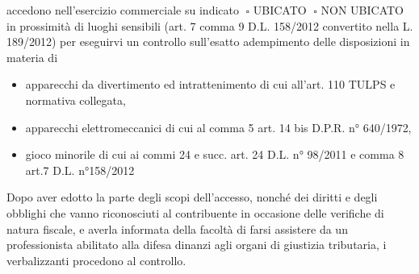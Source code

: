 \documentclass[12pt]{article}
\begin{document}
accedono nell’esercizio commerciale su indicato \begin{math} \;\square\end{math} UBICATO \begin{math}\;\square\end{math} NON UBICATO in prossimità di luoghi sensibili (art. 7 comma 9 D.L. 158/2012 convertito nella L. 189/2012)
per eseguirvi un controllo sull’esatto adempimento delle disposizioni in materia di
\begin{itemize}
    \item apparecchi da divertimento ed intrattenimento di cui all’art. 110 TULPS e normativa collegata, 
    \item apparecchi elettromeccanici di cui al comma 5 art. 14 bis D.P.R. n° 640/1972,
    \item gioco minorile di cui ai commi 24 e succ. art. 24 D.L. n° 98/2011 e comma 8 art.7 D.L. n°158/2012
\end{itemize}
Dopo aver edotto la parte degli scopi dell’accesso, nonché dei diritti e degli obblighi che vanno riconosciuti al contribuente in occasione delle verifiche di natura fiscale, e averla informata della facoltà di farsi assistere da un professionista abilitato alla difesa dinanzi agli organi di giustizia tributaria, i verbalizzanti procedono al controllo.

\newpage
\end{document}
